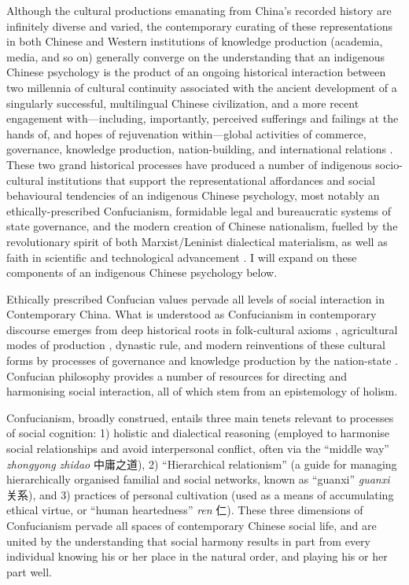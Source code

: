 \begin{CJK}{UTF8}{gbsn}
Although the cultural productions emanating from China's recorded history are infinitely diverse and varied, the contemporary curating of these representations in both Chinese and Western institutions of knowledge production (academia, media, and so on) generally converge on the understanding that an indigenous Chinese psychology is the product of an ongoing historical interaction between two millennia of cultural continuity associated with the ancient development of a singularly successful, multilingual Chinese civilization, and a more recent engagement with---including, importantly, perceived sufferings and failings at the hands of, and hopes of rejuvenation within---global activities of commerce, governance, knowledge production, nation-building, and international relations \citep{Liu2009}.  These two grand historical processes have produced a number of indigenous socio-cultural institutions that support the representational affordances and social behavioural tendencies of an indigenous Chinese psychology, most notably an ethically-prescribed Confucianism, formidable legal and bureaucratic systems of state governance, and the modern creation of Chinese nationalism, fuelled by the revolutionary spirit of both Marxist/Leninist dialectical materialism, as well as faith in scientific and technological advancement \citep{Barme2009}.  I will expand on these components of an indigenous Chinese psychology below.

Ethically prescribed Confucian values pervade all levels of social interaction in Contemporary China. What is understood as Confucianism in contemporary discourse emerges from deep historical roots in folk-cultural axioms \citep{Wang2009}, agricultural modes of production \citep{Talhelm2014,Fei1992}, dynastic rule, and modern reinventions of these cultural forms by processes of governance and knowledge production by the nation-state \citep{Hwang1999,Liu2014}.  Confucian philosophy provides a number of resources for directing and harmonising social interaction, all of which stem from an epistemology of holism.

Confucianism, broadly construed, entails three main tenets relevant to processes of social cognition: 1) holistic and dialectical reasoning (employed to harmonise social relationships and avoid interpersonal conflict, often via the ``middle way'' \textit{zhongyong zhidao} 中庸之道), 2) ``Hierarchical relationism'' (a guide for managing hierarchically organised familial and social networks, known as ``guanxi'' \textit{guanxi} 关系), and 3) practices of personal cultivation (used as a means of accumulating ethical virtue, or ``human heartedness'' \textit{ren} 仁).  These three dimensions of Confucianism pervade all spaces of contemporary Chinese social life, and are united by the understanding that social harmony results in part from every individual knowing his or her place in the natural order, and playing his or her part well.


\end{CJK}
